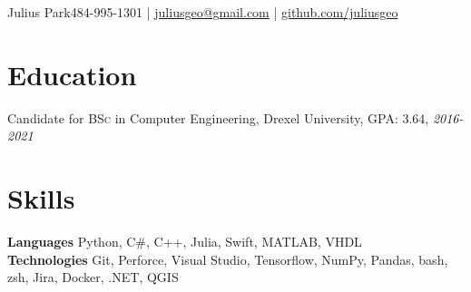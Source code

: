 \documentclass[11pt, a4paper]{article}
\begin{document}
\textsf{\Huge Julius Park}\hspace{4mm}484-995-1301 | \href{mailto:juliusgeo@gmail.com}{juliusgeo@gmail.com} | \href{github.com/juliusgeo}{github.com/juliusgeo}
\section*{Education}
\noindent Candidate for \textsc{BSc} in Computer Engineering, Drexel University, \textsc{GPA: 3.64,} \textit{2016-2021}

\vspace{-1mm}
\section*{Skills}
\textbf{Languages} Python, C\#, C++, Julia, Swift, MATLAB, VHDL\\ 
\textbf{Technologies} Git, Perforce, Visual Studio, Tensorflow, NumPy, Pandas, bash, zsh, Jira, Docker, .NET, QGIS
\end{document}
